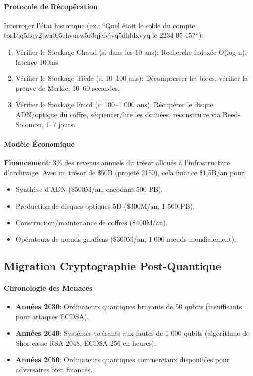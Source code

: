 \documentclass[11pt]{article}
\begin{document}
\paragraph{Protocole de Récupération}
Interroger l'état historique (ex.: ``Quel était le solde du compte tos1qq5hqy2jwn0r5ehvuew5r3qjcfvjvq5dhldxvyq le 2234-05-15?''):
\begin{enumerate}[noitemsep]
  \item Vérifier le Stockage Chaud (si dans les 10 ans): Recherche indexée O(log n), latence 100ms.
  \item Vérifier le Stockage Tiède (si 10--100 ans): Décompresser les blocs, vérifier la preuve de Merkle, 10--60 secondes.
  \item Vérifier le Stockage Froid (si 100--1 000 ans): Récupérer le disque ADN/optique du coffre, séquencer/lire les données, reconstruire via Reed-Solomon, 1--7 jours.
\end{enumerate}

\paragraph{Modèle Économique}
\textbf{Financement}: 3\% des revenus annuels du trésor alloués à l'infrastructure d'archivage. Avec un trésor de \$50B (projeté 2150), cela finance \$1,5B/an pour:
\begin{itemize}[noitemsep]
  \item Synthèse d'ADN (\$500M/an, encodant 500 PB).
  \item Production de disques optiques 5D (\$300M/an, 1 500 PB).
  \item Construction/maintenance de coffres (\$400M/an).
  \item Opérateurs de nœuds gardiens (\$300M/an, 1 000 nœuds mondialement).
\end{itemize}

\subsection{Migration Cryptographie Post-Quantique}

\paragraph{Chronologie des Menaces}
\begin{itemize}[noitemsep]
  \item \textbf{Années 2030}: Ordinateurs quantiques bruyants de 50 qubits (insuffisants pour attaques ECDSA).
  \item \textbf{Années 2040}: Systèmes tolérants aux fautes de 1 000 qubits (algorithme de Shor casse RSA-2048, ECDSA-256 en heures).
  \item \textbf{Années 2050}: Ordinateurs quantiques commerciaux disponibles pour adversaires bien financés.
\end{itemize}
\end{document}

